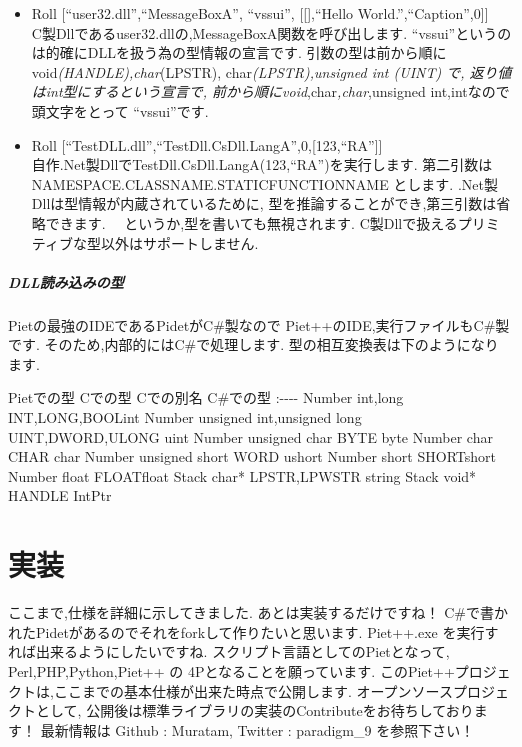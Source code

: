 \begin{itemize}
\item
  Roll {[}``user32.dll'',``MessageBoxA'', ``vssui'', {[}{[}{]},``Hello
  World.'',``Caption'',0{]}{]}\\C製Dllであるuser32.dllの,MessageBoxA関数を呼び出します.
  ``vssui''というのは的確にDLLを扱う為の型情報の宣言です.
  引数の型は前から順に void\emph{(HANDLE),char}(LPSTR),
  char\emph{(LPSTR),unsigned int (UINT) で,
  返り値はint型にするという宣言で,
  前から順にvoid},char\emph{,char},unsigned int,intなので 頭文字をとって
  ``vssui''です.
\item
  Roll
  {[}``TestDLL.dll'',``TestDll.CsDll.LangA'',0,{[}123,``RA''{]}{]}\\自作.Net製DllでTestDll.CsDll.LangA(123,``RA'')を実行します.
  第二引数は NAMESPACE.CLASSNAME.STATICFUNCTIONNAME とします.
  .Net製Dllは型情報が内蔵されているために,
  型を推論することができ,第三引数は省略できます.
  　というか,型を書いても無視されます.
  C製Dllで扱えるプリミティブな型以外はサポートしません.
\end{itemize}

\subparagraph{DLL読み込みの型}

Pietの最強のIDEであるPidetがC\#製なので
Piet++のIDE,実行ファイルもC\#製です. そのため,内部的にはC\#で処理します.
型の相互変換表は下のようになります.

\textbar{} Pietでの型 \textbar{} Cでの型 \textbar{} Cでの別名 \textbar{}
C\#での型\textbar{}
\textbar{}:-\textbar{}-\textbar{}-\textbar{}-\textbar{} \textbar{}
Number \textbar{} int,long \textbar{} INT,LONG,BOOL\textbar{}int
\textbar{} \textbar{} Number \textbar{} unsigned int,unsigned long
\textbar{} UINT,DWORD,ULONG \textbar{}uint\textbar{} \textbar{} Number
\textbar{} unsigned char\textbar{} BYTE \textbar{}byte\textbar{}
\textbar{} Number \textbar{} char \textbar{} CHAR
\textbar{}char\textbar{} \textbar{} Number \textbar{} unsigned short
\textbar{} WORD \textbar{}ushort\textbar{} \textbar{} Number \textbar{}
short\textbar{} SHORT\textbar{}short \textbar{} \textbar{} Number
\textbar{} float\textbar{} FLOAT\textbar{}float \textbar{} \textbar{}
Stack\textbar{} char* \textbar{} LPSTR,LPWSTR \textbar{}string\textbar{}
\textbar{} Stack\textbar{} void* \textbar{} HANDLE
\textbar{}IntPtr\textbar{}

\section{実装}

ここまで,仕様を詳細に示してきました. あとは実装するだけですね！
C\#で書かれたPidetがあるのでそれをforkして作りたいと思います. Piet++.exe
を実行すれば出来るようにしたいですね.
スクリプト言語としてのPietとなって, Perl,PHP,Python,Piet++ の
4Pとなることを願っています.
このPiet++プロジェクトは,ここまでの基本仕様が出来た時点で公開します.
オープンソースプロジェクトとして,
公開後は標準ライブラリの実装のContributeをお待ちしております！ 最新情報は
Github : Muratam, Twitter : paradigm\_9 を参照下さい！
